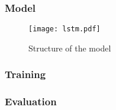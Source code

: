 \subsubsection{Model}
\begin{figure}[ht]
    \centering
    \texttt{[image: lstm.pdf]}
    \caption{Structure of the model}
    \label{fig:my_label}
\end{figure}

\subsubsection{Training}

\subsubsection{Evaluation}
